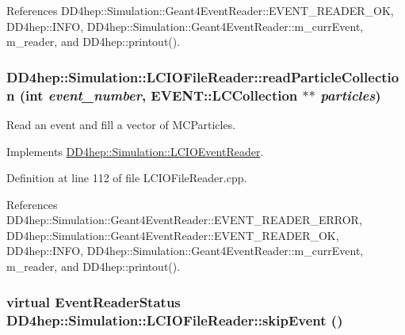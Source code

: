 References DD4hep::Simulation::Geant4EventReader::EVENT\_\-READER\_\-OK, DD4hep::INFO, DD4hep::Simulation::Geant4EventReader::m\_\-currEvent, m\_\-reader, and DD4hep::printout().\hypertarget{class_d_d4hep_1_1_simulation_1_1_l_c_i_o_file_reader_a4163f75ac06423136ab2c3e806713b83}{
\subsubsection[{readParticleCollection}]{ DD4hep::Simulation::LCIOFileReader::readParticleCollection (int {\em event\_\-number}, \/  EVENT::LCCollection $\ast$$\ast$ {\em particles})}}
\label{class_d_d4hep_1_1_simulation_1_1_l_c_i_o_file_reader_a4163f75ac06423136ab2c3e806713b83}


Read an event and fill a vector of MCParticles. 

Implements \hyperlink{class_d_d4hep_1_1_simulation_1_1_l_c_i_o_event_reader_a49acaafd98bbd6a954b29cfd9465d017}{DD4hep::Simulation::LCIOEventReader}.

Definition at line 112 of file LCIOFileReader.cpp.

References DD4hep::Simulation::Geant4EventReader::EVENT\_\-READER\_\-ERROR, DD4hep::Simulation::Geant4EventReader::EVENT\_\-READER\_\-OK, DD4hep::INFO, DD4hep::Simulation::Geant4EventReader::m\_\-currEvent, m\_\-reader, and DD4hep::printout().\hypertarget{class_d_d4hep_1_1_simulation_1_1_l_c_i_o_file_reader_a4b14dad308419f968982e216c11bb15a}{
\subsubsection[{skipEvent}]{\setlength{\rightskip}{0pt plus 5cm}virtual {\bf EventReaderStatus} DD4hep::Simulation::LCIOFileReader::skipEvent ()}}
\label{class_d_d4hep_1_1_simulation_1_1_l_c_i_o_file_reader_a4b14dad308419f968982e216c11bb15a}



